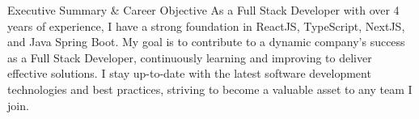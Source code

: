 \documentclass{resume} %
\begin{document}

\begin{rSection}{Executive Summary \& Career Objective}
As a Full Stack Developer with over 4 years of experience, I have a strong foundation in ReactJS, TypeScript, NextJS, and Java Spring Boot. My goal is to contribute to a dynamic company's success as a Full Stack Developer, continuously learning and improving to deliver effective solutions. I stay up-to-date with the latest software development technologies and best practices, striving to become a valuable asset to any team I join.
\end{rSection}

\end{document}
